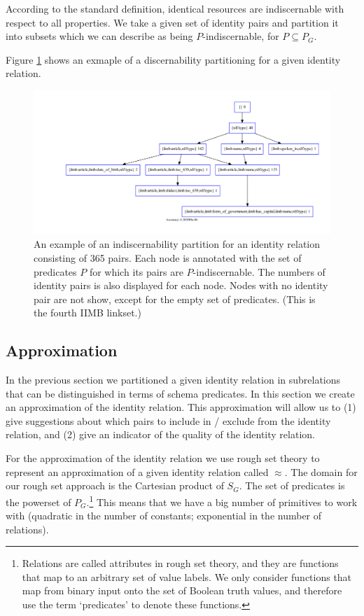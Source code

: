 \documentclass[letterpaper]{article}
\begin{document}
According to the standard definition, identical resources are indiscernable with respect to all properties. We take a given set of identity pairs and partition it into subsets which we can describe as being $P$-indiscernable, for $P \subseteq P_G$.

Figure \ref{fig:indiscernability_iimb} shows an exmaple of a discernability partitioning for a given identity relation.

\begin{figure}
\label{fig:indiscernability_iimb}
\caption{An example of an indiscernability partition for an identity relation consisting of 365 pairs. Each node is annotated with the set of predicates $P$ for which its pairs are $P$-indiscernable. The numbers of identity pairs is also displayed for each node. Nodes with no identity pair are not show, except for the empty set of predicates. (This is the fourth IIMB linkset.)}
\includegraphics[scale=0.7]{iimb_discernability_example}
\end{figure}

\subsection{Approximation}
\label{sec:approximation}

In the previous section we partitioned a given identity relation in subrelations that can be distinguished in terms of schema predicates. In this section we create an approximation of the identity relation. This approximation will allow us to (1) give suggestions about which pairs to include in / exclude from the identity relation, and (2) give an indicator of the quality of the identity relation.

For the approximation of the identity relation we use rough set theory \cite{pawlak_1991} to represent an approximation of a given identity relation called $\approx$. The domain for our rough set approach is the Cartesian product of $S_G$. The set of predicates is the powerset of $P_G$.\footnote{Relations are called attributes in rough set theory, and they are functions that map to an arbitrary set of value labels. We only consider functions that map from binary input onto the set of Boolean truth values, and therefore use the term `predicates' to denote these functions.} This means that we have a big number of primitives to work with (quadratic in the number of constants; exponential in the number of relations).
\end{document}
